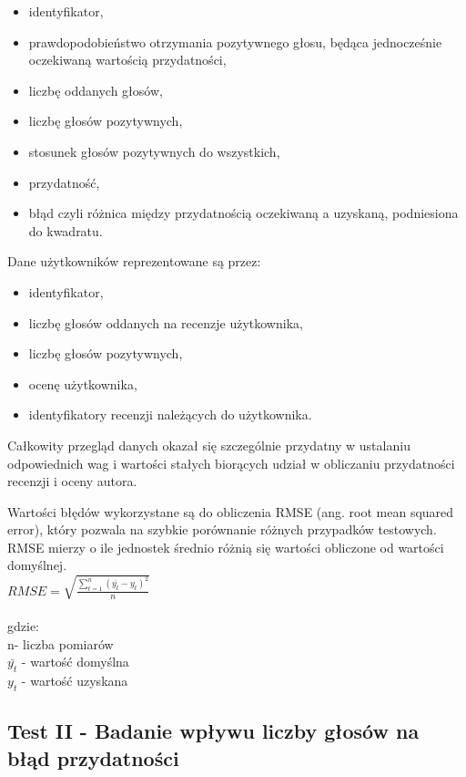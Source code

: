 \begin{itemize}
\item identyfikator,
\item prawdopodobieństwo otrzymania pozytywnego głosu, będąca jednocześnie oczekiwaną wartością przydatności,
\item liczbę oddanych głosów,
\item liczbę głosów pozytywnych,
\item stosunek głosów pozytywnych do wszystkich,
\item przydatność,
\item błąd czyli różnica między przydatnością oczekiwaną a uzyskaną, podniesiona do kwadratu.
\end{itemize}

Dane użytkowników reprezentowane są przez:

\begin{itemize}
\item identyfikator,
\item liczbę głosów oddanych na recenzje użytkownika,
\item liczbę głosów pozytywnych,
\item ocenę użytkownika,
\item identyfikatory recenzji należących do użytkownika.
\end{itemize}

Całkowity przegląd danych okazał się szczególnie przydatny w ustalaniu odpowiednich wag i wartości stałych biorących udział w obliczaniu przydatności recenzji i oceny autora.

Wartości błędów wykorzystane są do obliczenia RMSE (ang. root mean squared error), który pozwala na szybkie porównanie różnych przypadków testowych. RMSE mierzy o ile jednostek średnio różnią się wartości obliczone od wartości domyślnej.\cite{rmseWiki}\\

$ RMSE=\sqrt{\frac{\sum_{t=1}^n (\bar{y_{t}}-y_{t})^2}{n}} $\\\\
gdzie:\\
n- liczba pomiarów\\
$\bar{y_{t}}$ - wartość domyślna\\
$y_{t}$ - wartość uzyskana\\

\subsection{Test II - Badanie wpływu liczby głosów na błąd przydatności}

